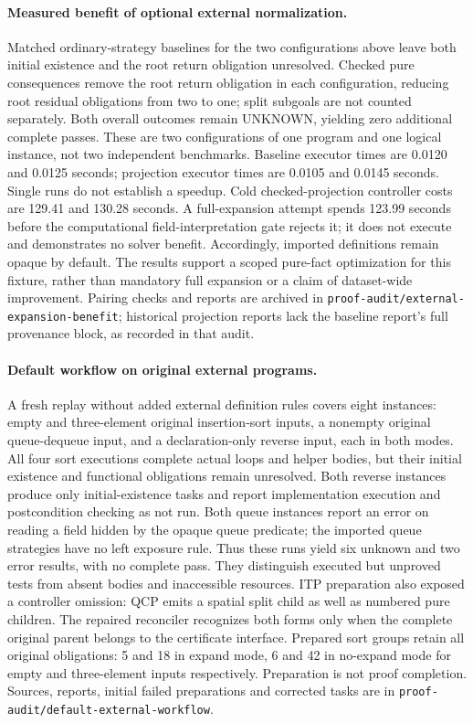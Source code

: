 \paragraph{Measured benefit of optional external normalization.}
Matched ordinary-strategy baselines for the two configurations above leave
both initial existence and the root return obligation unresolved. Checked
pure consequences remove the root return obligation in each configuration,
reducing root residual obligations from two to one; split subgoals are not
counted separately. Both overall outcomes remain \textsf{UNKNOWN}, yielding
zero additional complete passes. These are two configurations of one program
and one logical instance, not two independent benchmarks. Baseline executor
times are 0.0120 and 0.0125 seconds; projection executor times are 0.0105 and
0.0145 seconds. Single runs do not establish a speedup. Cold checked-projection
controller costs are 129.41 and 130.28 seconds. A full-expansion attempt spends
123.99 seconds before the computational field-interpretation gate rejects it;
it does not execute and demonstrates no solver benefit. Accordingly, imported
definitions remain opaque by default. The results support a scoped pure-fact
optimization for this fixture, rather than mandatory full expansion or a
claim of dataset-wide improvement. Pairing checks and reports are archived in
\texttt{proof-audit/external-expansion-benefit}; historical projection reports
lack the baseline report's full provenance block, as recorded in that audit.

\paragraph{Default workflow on original external programs.}
A fresh replay without added external definition rules covers eight instances:
empty and three-element original insertion-sort inputs, a nonempty original
queue-dequeue input, and a declaration-only reverse input, each in both modes.
All four sort executions complete actual loops and helper bodies, but their
initial existence and functional obligations remain unresolved. Both reverse
instances produce only initial-existence tasks and report implementation
execution and postcondition checking as not run. Both queue instances report
an error on reading a field hidden by the opaque queue predicate; the imported
queue strategies have no left exposure rule. Thus these runs yield six unknown
and two error results, with no complete pass. They distinguish executed but
unproved tests from absent bodies and inaccessible resources. ITP preparation
also exposed a controller omission: QCP emits a spatial split child as well as
numbered pure children. The repaired reconciler recognizes both forms only
when the complete original parent belongs to the certificate interface.
Prepared sort groups retain all original obligations: 5 and 18 in expand mode,
6 and 42 in no-expand mode for empty and three-element inputs respectively.
Preparation is not proof completion. Sources, reports, initial failed
preparations and corrected tasks are in
\texttt{proof-audit/default-external-workflow}.

